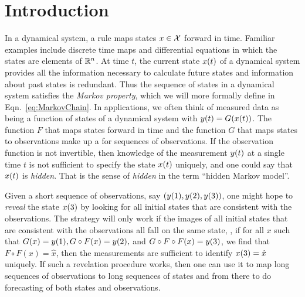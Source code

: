 \chapter{Introduction}
\label{chap:introduction}

In a dynamical system, a rule maps states $x\in\cal X$ forward in
time.  Familiar examples include discrete time maps
and differential equations
in which the states are elements of $\mathbb{R}^n$.  At time $t$, the
current state ${x}{(t)}$ of a dynamical system provides all the
information necessary to calculate future states and information about
past states is redundant.  Thus the sequence of states in a dynamical
system satisfies the \emph{Markov property}, which we will more
formally define in Eqn.~\eqref{eq:MarkovChain}.  In applications, we
often think of measured data as being a function of states of a
dynamical system with $ {y}{(t)} = G({x}{(t)})$.  The function $F$
that maps states forward in time and the function $G$ that maps states
to observations make up a \emph{} for
sequences of observations.  If the observation function is not
invertible, then knowledge of the measurement ${y}{(t)}$ at a single
time $t$ is not sufficient to specify the state ${x}{(t)}$ uniquely,
and one could say that ${x}{(t)}$ is \emph{hidden}.  That is the
sense of \emph{hidden} in the term ``hidden Markov model''.

Given a short sequence of observations, say $\left(
  {y}{(1)},{y}{(2)}, {y}{(3)}\right)$, one might hope to
\emph{reveal} the state ${x}{(3)}$ by looking for all initial states
that are consistent with the observations.  The strategy will only
work if the images of all initial states that are consistent with the
observations all fall on the same state, \ie, if for all $x$ such that
$ G(x) = {y}{(1)}, G\circ F(x) = {y}{(2)},$ and $G\circ F\circ F(x)
= {y}{(3)}$, we find that $F\circ F(x) = \hat x$, then the
measurements are sufficient to identify ${x}{(3)} = \hat x$ uniquely.
If such a revelation procedure works, then one can use it to map long
sequences of observations to long sequences of states and from there
to do forecasting of both states and observations.

